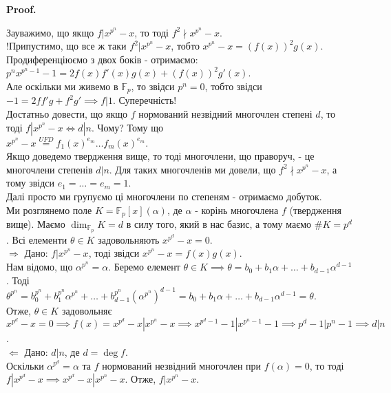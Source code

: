 \documentclass[a4paper, 14pt]{extarticle}
\makeatletter
\theoremstyle{theoremdd}
\theoremstyle{theoremdd}
\theoremstyle{theoremdd}
\theoremstyle{theoremdd}
\theoremstyle{theoremdd}
\theoremstyle{theoremdd}
\theoremstyle{theoremdd}
\theoremstyle{theoremdd}
\def\qed{$\blacksquare$}
\def\rightproof{$\boxed{\Rightarrow}$ }
\def\leftproof{$\boxed{\Leftarrow}$ }
\renewenvironment{proof}[1][Proof.\\]{\par
\pushQED{\hfill \qed}%
\normalfont \topsep6\p@\@plus6\p@\relax
\trivlist
\item\relax
{\bfseries
#1\@addpunct{.}}\hspace\labelsep\ignorespaces
}{%
\popQED\endtrivlist\@endpefalse
}
\makeatother
\begin{document}
\begin{proof}
Зауважимо, що якщо $f | x^{p^n} - x$, то тоді $f^2 \nmid x^{p^n} - x$.\\
!Припустимо, що все ж таки $f^2 | x^{p^n} - x$, тобто $x^{p^n} - x = (f(x))^2 g(x)$. Продиференціюємо з двох боків - отримаємо:\\
$p^n x^{p^n-1} - 1 = 2f(x)f'(x)g(x) + (f(x))^2g'(x)$.\\
Але оскільки ми живемо в $\mathbb{F}_p$, то звідси $p^n = 0$, тобто звідси\\
$-1 = 2ff'g + f^2g' \implies f | 1$. Суперечність!
\bigskip \\
Достатньо довести, що якщо $f$ нормований незвідний многочлен степені $d$, то тоді $f | x^{p^n} - x \iff d | n$. Чому? Тому що\\
$x^{p^n} - x \overset{UFD}{=} f_1(x)^{e_m} \dots f_m(x)^{e_m}$.\\
Якщо доведемо твердження вище, то тоді многочлени, що праворуч, - це многочлени степенів $d | n$. Для таких многочленів ми довели, що $f^2 \nmid x^{p^n} - x$, а тому звідси $e_1 = \dots = e_m = 1$.\\
Далі просто ми групуємо ці многочлени по степеням - отримаємо добуток.
\bigskip \\
Ми розглянемо поле $K = \mathbb{F}_p[x](\alpha)$, де $\alpha$ - корінь многочлена $f$ (твердження вище). Маємо $\dim_{\mathbb{F}_p} K = d$ в силу того, який в нас базис, а тому маємо $\# K = p^d$. Всі елементи $\theta \in K$ задовольняють $x^{p^d} - x =0$.
\bigskip \\
\rightproof Дано: $f | x^{p^n} - x$, тоді звідси $x^{p^n} - x = f(x)g(x)$.\\
Нам відомо, що $\alpha^{p^n} = \alpha$. Беремо елемент $\theta \in K \implies \theta = b_0 + b_1 \alpha + \dots + b_{d-1} \alpha^{d-1}$. Тоді\\
$\theta^{p^n} = b_0^{p^n} + b_1^{p^n} \alpha^{p^n} + \dots + b_{d-1}^{p^n} (\alpha^{p^n})^{d-1} = b_0 + b_1 \alpha + \dots + b_{d-1} \alpha^{d-1} = \theta$.\\
Отже, $\theta \in K$ задовольняє $x^{p^d} - x =0 \implies f(x) = x^{p^d} - x | x^{p^n} - x \implies x^{p^d-1}-1 | x^{p^n-1}-1 \implies p^d-1 | p^n - 1 \implies d|n$.\\
\leftproof Дано: $d | n$, де $d = \deg f$.\\
Оскільки $\alpha^{p^d} = \alpha$ та $f$ нормований незвідний многочлен при $f(\alpha) = 0$, то тоді $f | x^{p^d} - x \implies x^{p^d} - x | x^{p^n} - x$. Отже, $f | x^{p^n}-x$.
\end{proof}
\end{document}
